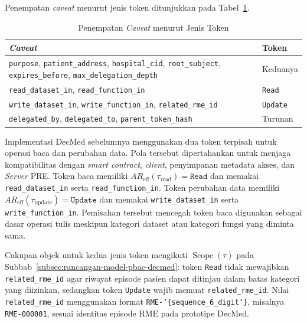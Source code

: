 \documentclass[bahasa, 12pt, a4paper, onecolumn, oneside, final]{report}
\begin{document}
Penempatan \textit{caveat} menurut jenis token ditunjukkan pada Tabel~\ref{tab:penempatan-caveat-macaroon}.

\begin{table}[!ht]
	\centering
	\caption{Penempatan \textit{Caveat} menurut Jenis Token}
	\label{tab:penempatan-caveat-macaroon}
	\small
	\begin{tabular}{|p{}|p{}|}
		\hline
		\textbf{\textit{Caveat}}
		 & \textbf{Token}  \\ \hline

		\texttt{purpose}, \texttt{patient\_address}, \texttt{hospital\_cid}, \texttt{root\_subject}, \texttt{expires\_before}, \texttt{max\_delegation\_depth}
		 & Keduanya        \\ \hline

		\texttt{read\_dataset\_in}, \texttt{read\_function\_in}
		 & \texttt{Read}   \\ \hline

		\texttt{write\_dataset\_in}, \texttt{write\_function\_in}, \texttt{related\_rme\_id}
		 & \texttt{Update} \\ \hline

		\texttt{delegated\_by}, \texttt{delegated\_to}, \texttt{parent\_token\_hash}
		 & Turunan         \\ \hline
	\end{tabular}
\end{table}

Implementasi DecMed sebelumnya menggunakan dua token terpisah untuk operasi baca dan perubahan data. Pola tersebut dipertahankan untuk menjaga kompatibilitas dengan \textit{smart contract}, \textit{client}, penyimpanan metadata akses, dan \textit{Server} PRE. Token baca memiliki $AR_{\operatorname{eff}}(\tau_{\operatorname{read}})=\texttt{Read}$ dan memakai \texttt{read\_dataset\_in} serta \texttt{read\_function\_in}. Token perubahan data memiliki $AR_{\operatorname{eff}}(\tau_{\operatorname{update}})=\texttt{Update}$ dan memakai \texttt{write\_dataset\_in} serta \texttt{write\_function\_in}. Pemisahan tersebut mencegah token baca digunakan sebagai dasar operasi tulis meskipun kategori dataset atau kategori fungsi yang diminta sama.

Cakupan objek untuk kedua jenis token mengikuti $\operatorname{Scope}(\tau)$ pada Subbab~\ref{subsec:rancangan-model-pbac-decmed}: token \texttt{Read} tidak mewajibkan \texttt{related\_rme\_id} agar riwayat episode pasien dapat ditinjau dalam batas kategori yang diizinkan, sedangkan token \texttt{Update} wajib memuat \texttt{related\_rme\_id}. Nilai \texttt{related\_rme\_id} menggunakan format \texttt{RME-\char`\{sequence\_6\_digit\char`\}}, misalnya \texttt{RME-000001}, sesuai identitas episode RME pada prototipe DecMed.
\end{document}

